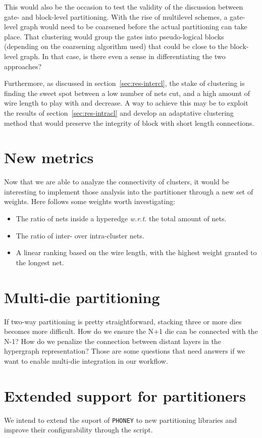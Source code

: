 \documentclass[11pt,a4paper]{report} %
\theoremstyle{customdef}
\begin{document}
This would also be the occasion to test the validity of the discussion between gate- and block-level partitioning.
With the rise of multilevel schemes, a gate-level graph would need to be coarsened before the actual partitioning can take place.
That clustering would group the gates into pseudo-logical blocks (depending on the coarsening algorithm used) that could be close to the block-level graph.
In that case, is there even a sense in differentiating the two approaches?

Furthermore, as discussed in section~\ref{sec:res-intercl}, the stake of clustering is finding the sweet spot between a low number of nets cut, and a high amount of wire length to play with and decrease.
A way to achieve this may be to exploit the results of section~\ref{sec:res-intracl} and develop an adaptative clustering method that would preserve the integrity of block with short length connections.




\section{New metrics}
Now that we are able to analyze the connectivity of clusters, it would be interesting to implement those analysis into the partitioner through a new set of weights.
Here follows some weights worth investigating:
\begin{itemize}
	\item The ratio of nets inside a hyperedge \textit{w.r.t.} the total amount of nets.
	\item The ratio of inter- over intra-cluster nets.
	\item A linear ranking based on the wire length, with the highest weight granted to the longest net.
\end{itemize}



\section{Multi-die partitioning}
If two-way partitioning is pretty straightforward, stacking three or more dies becomes more difficult.
How do we ensure the N+1 die can be connected with the N-1?
How do we penalize the connection between distant layers in the hypergraph representation?
Those are some questions that need answers if we want to enable multi-die integration in our workflow.

\section{Extended support for partitioners}
We intend to extend the suport of \texttt{PHONEY} to new partitioning libraries and improve their configurability through the script.

\clearpage

\newpage

% 

\end{document}
